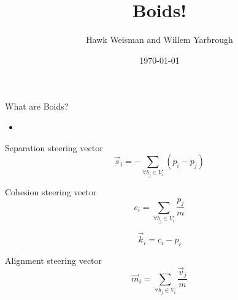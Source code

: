 \documentclass{beamer}
\title{Boids!}
\author[Weisman and Yarbrough]{Hawk Weisman and Willem Yarbrough}
\institute[Allegheny College]{Department of Computer Science \\ Allegheny College}
\date{\today}
\begin{document}
\begin{frame}
  \titlepage
\end{frame}

\begin{frame}
    \huge{What are Boids?}\normalsize
    \begin{itemize}
        \item %
    \end{itemize}

\end{frame}

\begin{frame}
    \huge{Separation steering vector}\normalsize
\[ \vec{s}_i = - \sum\limits_{\forall b_j \in V_i} (p_i - p_j) \]

\end{frame}

\begin{frame}
    \huge{Cohesion steering vector}\normalsize
\[ c_i = \sum\limits_{\forall b_j \in V_i} \frac{p_j}{m} \]

\[ \vec{k}_i = c_i - p_i \]

\end{frame}

\begin{frame}[fragile]
    \huge{Alignment steering vector}\normalsize
    \[ \vec{m}_i = \sum\limits_{\forall b_j \in V_i} \frac{\vec{v}_j}{m} \]

\end{frame}
\end{document}

